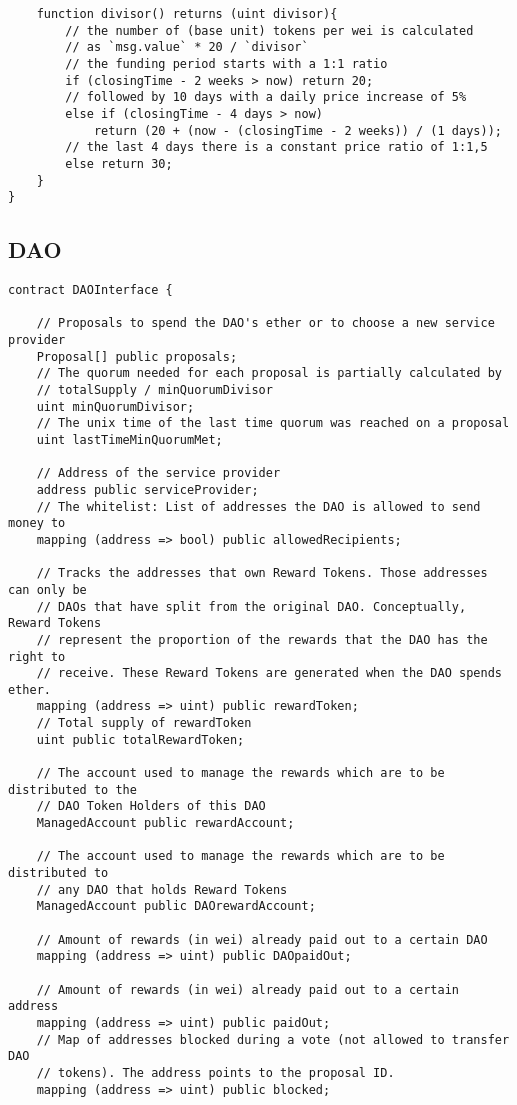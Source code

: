 \documentclass[9pt,oneside]{amsart}
\begin{document}
\begin{appendix}
\begin{verbatim}
    function divisor() returns (uint divisor){
        // the number of (base unit) tokens per wei is calculated
        // as `msg.value` * 20 / `divisor`
        // the funding period starts with a 1:1 ratio
        if (closingTime - 2 weeks > now) return 20;
        // followed by 10 days with a daily price increase of 5%
        else if (closingTime - 4 days > now)
            return (20 + (now - (closingTime - 2 weeks)) / (1 days));
        // the last 4 days there is a constant price ratio of 1:1,5
        else return 30;
    }
}
\end{verbatim}
\subsection{DAO}\label{app:DAO}
\begin{verbatim}
contract DAOInterface {

    // Proposals to spend the DAO's ether or to choose a new service provider
    Proposal[] public proposals;
    // The quorum needed for each proposal is partially calculated by
    // totalSupply / minQuorumDivisor
    uint minQuorumDivisor;
    // The unix time of the last time quorum was reached on a proposal
    uint lastTimeMinQuorumMet;

    // Address of the service provider
    address public serviceProvider;
    // The whitelist: List of addresses the DAO is allowed to send money to
    mapping (address => bool) public allowedRecipients;

    // Tracks the addresses that own Reward Tokens. Those addresses can only be
    // DAOs that have split from the original DAO. Conceptually, Reward Tokens
    // represent the proportion of the rewards that the DAO has the right to
    // receive. These Reward Tokens are generated when the DAO spends ether.
    mapping (address => uint) public rewardToken;
    // Total supply of rewardToken
    uint public totalRewardToken;

    // The account used to manage the rewards which are to be distributed to the
    // DAO Token Holders of this DAO
    ManagedAccount public rewardAccount;

    // The account used to manage the rewards which are to be distributed to
    // any DAO that holds Reward Tokens
    ManagedAccount public DAOrewardAccount;

    // Amount of rewards (in wei) already paid out to a certain DAO
    mapping (address => uint) public DAOpaidOut;

    // Amount of rewards (in wei) already paid out to a certain address
    mapping (address => uint) public paidOut;
    // Map of addresses blocked during a vote (not allowed to transfer DAO
    // tokens). The address points to the proposal ID.
    mapping (address => uint) public blocked;


\end{verbatim}
\end{appendix}
\end{document}
